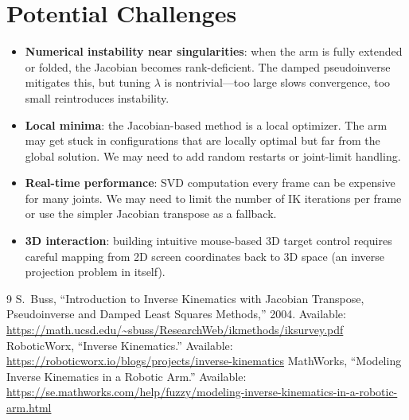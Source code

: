 \documentclass[11pt]{article}
\begin{document}
\section{Potential Challenges}

\begin{itemize}[nosep]
    \item \textbf{Numerical instability near singularities}: when the arm is fully extended or folded, the Jacobian becomes rank-deficient. The damped pseudoinverse mitigates this, but tuning $\lambda$ is nontrivial---too large slows convergence, too small reintroduces instability.
    \item \textbf{Local minima}: the Jacobian-based method is a local optimizer. The arm may get stuck in configurations that are locally optimal but far from the global solution. We may need to add random restarts or joint-limit handling.
    \item \textbf{Real-time performance}: SVD computation every frame can be expensive for many joints. We may need to limit the number of IK iterations per frame or use the simpler Jacobian transpose as a fallback.
    \item \textbf{3D interaction}: building intuitive mouse-based 3D target control requires careful mapping from 2D screen coordinates back to 3D space (an inverse projection problem in itself).
\end{itemize}

\begin{thebibliography}{9}
 S.~Buss, ``Introduction to Inverse Kinematics with Jacobian Transpose, Pseudoinverse and Damped Least Squares Methods,'' 2004. Available: \url{https://math.ucsd.edu/~sbuss/ResearchWeb/ikmethods/iksurvey.pdf}
 RoboticWorx, ``Inverse Kinematics.'' Available: \url{https://roboticworx.io/blogs/projects/inverse-kinematics}
 MathWorks, ``Modeling Inverse Kinematics in a Robotic Arm.'' Available: \url{https://se.mathworks.com/help/fuzzy/modeling-inverse-kinematics-in-a-robotic-arm.html}
\end{thebibliography}
\end{document}
